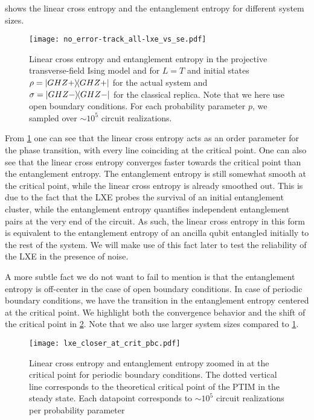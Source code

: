 shows the linear cross entropy and the
entanglement entropy for different system sizes.
\begin{figure}[h]
  \centering
  \texttt{[image: no\_error-track\_all-lxe\_vs\_se.pdf]}
  \caption{Linear cross entropy and entanglement entropy in the projective
  transverse-field Ising model and for $L=T$ and initial states $\rho =
  \dyad{GHZ+}$ for the actual system and $\sigma=\dyad{GHZ-}$ for the classical
  replica. Note that we here use open boundary conditions. For each probability
  parameter $p$, we sampled over $\sim 10^5$ circuit realizations.}
  \label{fig:lxe-vs-se-default}
\end{figure}

From \cref{fig:lxe-vs-se-default} one can see that the linear cross entropy
acts as an order parameter for the phase transition, with every line coinciding
at the critical point. One can also see that the linear cross entropy converges
faster towards the critical point than the entanglement entropy. The
entanglement entropy is still somewhat smooth at the critical point, while the
linear cross entropy is already smoothed out. This is due to the fact that the
LXE probes the survival of an initial entanglement cluster, while the
entanglement entropy quantifies independent entanglement pairs at the very end
of the circuit. As such, the linear cross entropy in this form is equivalent to
the entanglement entropy of an ancilla qubit entangled initially to the rest of
the system. We will make use of this fact later to test the reliability of the
LXE in the presence of noise.

A more subtle fact we do not want to fail to mention is that the entanglement
entropy is off-center in the case of open boundary conditions. In case of
periodic boundary conditions, we have the transition in the entanglement
entropy centered at the critical point.
We highlight both the convergence behavior and the shift of the critical point
in \cref{fig:lxe-closer-at-crit}. Note that we also use larger system sizes
compared to \cref{fig:lxe-vs-se-default}.

\begin{figure}[h]
  \centering
  \texttt{[image: lxe\_closer\_at\_crit\_pbc.pdf]}
  \caption{Linear cross entropy and entanglement entropy zoomed in at the
  critical point for periodic boundary conditions. The dotted vertical line
corresponds to the theoretical critical point of the PTIM in the steady state.
Each datapoint corresponds to $\sim 10^5$ circuit realizations per probability
parameter}
  \label{fig:lxe-closer-at-crit}
\end{figure}

